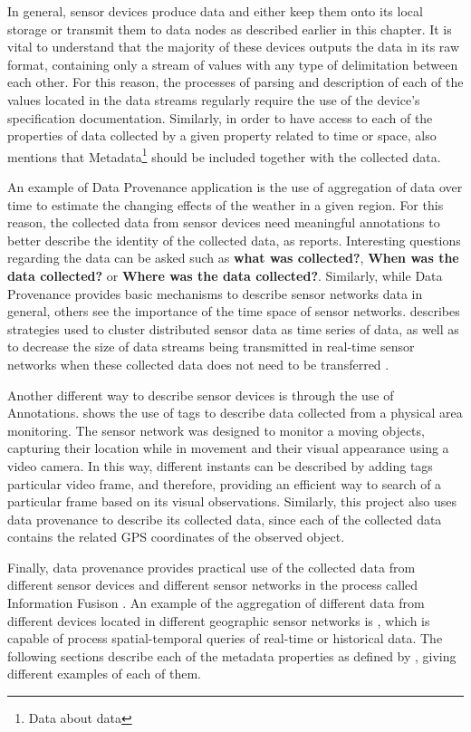 In general, sensor devices produce data and either keep them onto its local
storage or transmit them to data nodes as described earlier in this chapter. It
is vital to understand that the majority of these devices outputs the data in
its raw format, containing only a stream of values with any type of
delimitation between each other. For this reason, the processes of parsing and
description of each of the values located in the data streams regularly
require the use of the device's specification documentation. Similarly, in
order to have access to each of the properties of data collected by a given
property related to time or space, \cite{sn-provenance} also mentions that
Metadata\footnote{Data about data} should be included together with the
collected data.

An example of Data Provenance application is the use of aggregation of data
over time to estimate the changing effects of the weather in a given region.
For this reason, the collected data from sensor devices need meaningful
annotations to better describe the identity of the collected data, as 
\cite{sn-provenance} reports. Interesting questions regarding the
data can be asked such as \textbf{what was collected?}, \textbf{When was the
data collected?} or \textbf{Where was the data collected?}. Similarly, while
Data Provenance provides basic mechanisms to describe sensor networks data in
general, others see the importance of the time space of sensor networks.
\cite{sn-time-series} describes strategies used to cluster distributed sensor
data as time series of data, as well as to decrease the size of data streams
being transmitted in real-time sensor networks when these collected data does
not need to be transferred \cite{sn-data-reduction}.

Another different way to describe sensor devices is through the use of
Annotations. \cite{sn-annotation} shows the use of tags to describe data
collected from a physical area monitoring. The sensor network was
designed to monitor a moving objects, capturing their location while in
movement and their visual appearance using a video camera. In this way,
different instants can be described by adding tags particular video frame, and
therefore, providing an efficient way to search of a particular frame based on
its visual observations. Similarly, this project also uses data provenance to
describe its collected data, since each of the collected data contains the
related GPS coordinates of the observed object.

Finally, data provenance provides practical use of the collected data from
different sensor devices and different sensor networks in the process called
Information Fusison \cite{sn-info-fusion}. An example of the aggregation of
different data from different devices located in different geographic sensor
networks is \cite{sn-geo-metadata}, which is capable of process
spatial-temporal queries of real-time or historical data. The following
sections describe each of the metadata properties as defined by
\cite{sn-provenance}, giving different examples of each of them.

